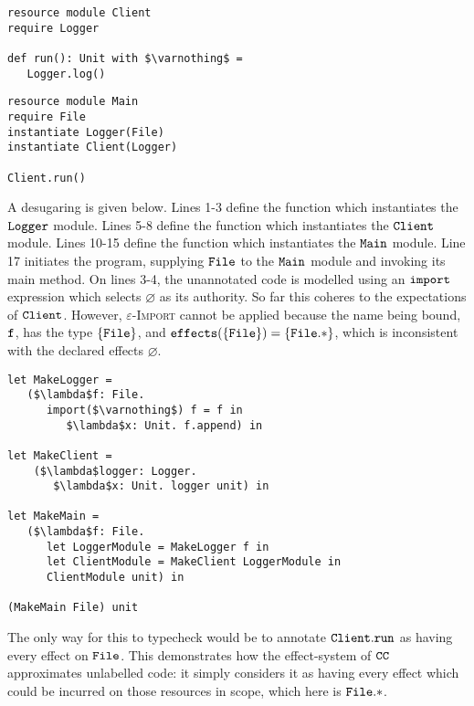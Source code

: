 \begin{lstlisting}
resource module Client
require Logger

def run(): Unit with $\varnothing$ =
   Logger.log()
\end{lstlisting}

\begin{lstlisting}
resource module Main
require File
instantiate Logger(File)
instantiate Client(Logger)

Client.run()
\end{lstlisting}

A desugaring is given below. Lines 1-3 define the function which instantiates the $\mathtt{Logger}$ module. Lines 5-8 define the function which instantiates the $\mathtt{Client}$ module. Lines 10-15 define the function which instantiates the $\mathtt{Main}$ module. Line 17 initiates the program, supplying $\mathtt{File}$ to the $\mathtt{Main}$ module and invoking its main method. On lines 3-4, the unannotated code is modelled using an $\mathtt{import}$ expression which selects $\varnothing$ as its authority. So far this coheres to the expectations of $\mathtt{Client}$. However, \textsc{$\varepsilon$-Import} cannot be applied because the name being bound, $\mathtt{f}$, has the type $\{ \mathtt{File} \}$, and $\mathtt{effects}(\{ \mathtt{File} \}) = \{ \mathtt{File}.* \}$, which is inconsistent with the declared effects $\varnothing$.

\begin{lstlisting}
let MakeLogger =
   ($\lambda$f: File.
      import($\varnothing$) f = f in
         $\lambda$x: Unit. f.append) in

let MakeClient =
	($\lambda$logger: Logger.
	   $\lambda$x: Unit. logger unit) in

let MakeMain =
   ($\lambda$f: File.
      let LoggerModule = MakeLogger f in
      let ClientModule = MakeClient LoggerModule in
      ClientModule unit) in

(MakeMain File) unit
\end{lstlisting}

The only way for this to typecheck would be to annotate $\mathtt{Client.run}$ as having every effect on $\mathtt{File}$. This demonstrates how the effect-system of $\mathtt{CC}$ approximates unlabelled code: it simply considers it as having every effect which could be incurred on those resources in scope, which here is $\mathtt{File}.*$.



































